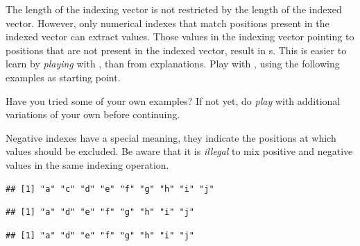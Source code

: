 \documentclass[krantz2]{krantz}\usepackage{knitr}%
\begin{document}
\begin{playground}
The length of the indexing vector is not restricted by the length of the indexed vector. However, only numerical indexes that match positions present in the indexed vector can extract values. Those values in the indexing vector pointing to positions that are not present in the indexed vector, result in s. This is easier to learn by \emph{playing} with \Rlang, than from explanations. Play with \Rlang, using the following examples as starting point.

\begin{knitrout}\footnotesize
{}\color{fgcolor}\begin{kframe}
\begin{alltt}
\hlstd{a[}\hlstd{(}\hlstd{,}\hlstd{,}\hlstd{,}\hlstd{)]}
\hlstd{a[}\hlstd{(}\hlopt{:}\hlstd{,} \hlopt{:}\hlstd{)]}
\hlstd{a[}\hlstd{(}\hlstd{,}\hlstd{)]}
\hlstd{a[}\hlstd{]}
\end{alltt}
\end{kframe}
\end{knitrout}

Have you tried some of your own examples? If not yet, do \emph{play} with additional variations of your own before continuing.

\end{playground}

Negative indexes have a special meaning, they indicate the positions at which values should be excluded. Be aware that it is \emph{illegal} to mix positive and negative values in the same indexing operation.

\begin{knitrout}\footnotesize
{}\color{fgcolor}\begin{kframe}
\begin{alltt}
\hlstd{a[}\hlopt{-}\hlstd{]}
\end{alltt}
\begin{verbatim}
## [1] "a" "c" "d" "e" "f" "g" "h" "i" "j"
\end{verbatim}
\begin{alltt}
\hlstd{a[}\hlopt{-}\hlstd{(}\hlstd{,}\hlstd{)]}
\end{alltt}
\begin{verbatim}
## [1] "a" "d" "e" "f" "g" "h" "i" "j"
\end{verbatim}
\begin{alltt}
\hlstd{a[}\hlopt{-}\hlopt{:-}\hlstd{]}
\end{alltt}
\begin{verbatim}
## [1] "a" "d" "e" "f" "g" "h" "i" "j"
\end{verbatim}
\begin{alltt}
\end{alltt}
\end{kframe}
\end{knitrout}
\end{document}
